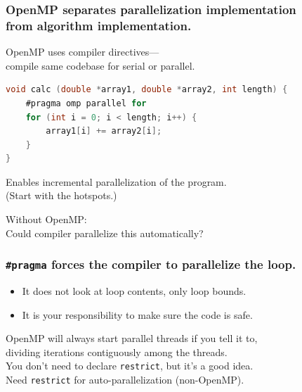 \begin{frame}[containsverbatim]
  \frametitle{OpenMP separates parallelization implementation \\ from algorithm implementation.}

\large
  
\begin{changemargin}{1.5cm}
    OpenMP uses compiler directives---\\
    \hspace*{2em} compile same codebase for serial or parallel.

  \begin{lstlisting}[language=C,morekeywords={foreach,pragma,omp,parallel,single,nowait,task,untied,barrier,taskyield}]
void calc (double *array1, double *array2, int length) {
    #pragma omp parallel for
    for (int i = 0; i < length; i++) {
        array1[i] += array2[i];
    }
}
  \end{lstlisting}

    Enables incremental parallelization of the program.\\
    (Start with the hotspots.)

  Without OpenMP: \\ \quad Could compiler parallelize this automatically?
\end{changemargin}

\end{frame}

\begin{frame}[containsverbatim]
  \frametitle{{\tt \#pragma} forces the compiler to parallelize the loop.}

\large
  
\begin{changemargin}{1cm}
  \begin{itemize}
    \item It does not look at loop contents, only loop bounds.
    \item \alert{It is your responsibility to make sure the code is safe.}
  \end{itemize}
  OpenMP will always start parallel threads if you tell it to,\\
  dividing iterations contiguously among the threads.\\[1em]

  You don't need to declare {\tt restrict}, but it's a good idea.\\
  Need {\tt restrict} for auto-parallelization (non-OpenMP).
\end{changemargin}

\end{frame}

